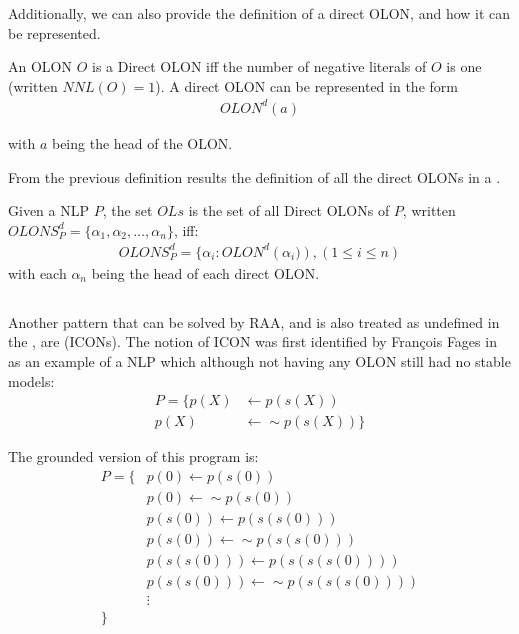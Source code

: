 Additionally, we can also provide the definition of a direct OLON, and how it can be represented.

\begin{definition}
\label{def:dOLON}
An OLON $O$ is a Direct OLON iff the number of negative literals of $O$ is one (written $NNL(O) = 1$). A direct OLON can be represented in the form
\begin{align*}
OLON^{d}\left(a\right)
\end{align*}

with $a$ being the head of the OLON. 

\end{definition}

From the previous definition results the definition of all the direct OLONs in a \nlp.

\begin{definition}
Given a NLP $P$, the set $OLs$ is the set of all Direct OLONs of $P$, written $OLONS_{P}^{d}=\{\alpha_{1},\alpha_{2},\ldots,\alpha_{n}\}$, iff:
\begin{align*}
OLONS_{P}^{d}=\{\alpha_{i}:OLON^{d}\left(\alpha_{i})\right), (1\leq i\leq n)
\end{align*}
with each $\alpha_{n}$ being the head of each direct OLON.
\end{definition}





\subsection{\ICONs}
Another pattern that can be solved by RAA, and is also treated as undefined in the \wfs, are \icons (ICONs). The notion of ICON was first identified by François Fages in \cite{fages} as an example of a NLP which although not having any OLON still had no stable models:
\begin{align*}
P=\{
 p(X) & \leftarrow p(s(X))\\
 p(X) & \leftarrow \sim p(s(X))
\}
\end{align*}

The grounded version of this program is:
\begin{align*}
P=\{
& p(0)\leftarrow p(s(0))\\
& p(0)\leftarrow \sim p(s(0))\\
& p(s(0))\leftarrow p(s(s(0)))\\
& p(s(0))\leftarrow \sim p(s(s(0)))\\
& p(s(s(0)))\leftarrow p(s(s(s(0))))\\
& p(s(s(0)))\leftarrow \sim p(s(s(s(0))))\\
& \vdots\\
\}
\end{align*}

